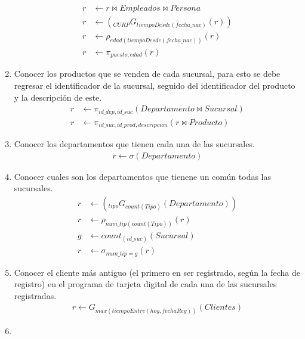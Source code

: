 \documentclass{article}
\begin{document}
\begin{enumerate}
{\begin{align*}
                r &\leftarrow r \bowtie Empleados \bowtie Persona \\
                r &\leftarrow (_{CURP}G_{tiempoDesde(fecha\_nac)}(r))\\
                r &\leftarrow \rho_{edad(tiempoDesde(fecha\_nac))}(r) \\
                r &\leftarrow \pi_{puesto, edad}(r)
            \end{align*}
        }
        \item {
            Conocer los productos que se venden de cada sucursal, para esto se 
            debe regresar el identificador de la sucursal, seguido del
            identificador del producto y la descripción de este.
            \begin{align*}
                r &\leftarrow \pi_{id\_dep, id\_suc}(Departamento \bowtie Sucursal)\\
                r &\leftarrow \pi_{id\_suc, id\_prod, descripcion}(r \bowtie Producto)
            \end{align*}
        }
        \item {
            Conocer los departamentos que tienen cada una de las sucursales.
            \begin{align*}
                r \leftarrow \sigma(Departamento)
            \end{align*}
        }
        \item {
            Conocer cuales son los departamentos que tienene un común todas las 
            sucursales.
            \begin{align*}
                r &\leftarrow (_{tipo}G_{count(Tipo)}(Departamento)) \\
                r &\leftarrow \rho_{num\_tip(count(Tipo))}(r) \\
                g &\leftarrow count_{(id\_suc)}(Sucursal) \\
                r &\leftarrow \sigma_{num\_tip = g}(r)
            \end{align*}
        }
        \item {
            Conocer el cliente más antiguo (el primero en ser registrado, según
            la fecha de registro) en el programa de tarjeta digital de cada una
            de las sucursales registradas.
            \begin{align*}
                r \leftarrow G_{max(tiempoEntre(hoy, fechaReg))}(Clientes)
            \end{align*}
        }
        \item {
}
\end{enumerate}
\end{document}
